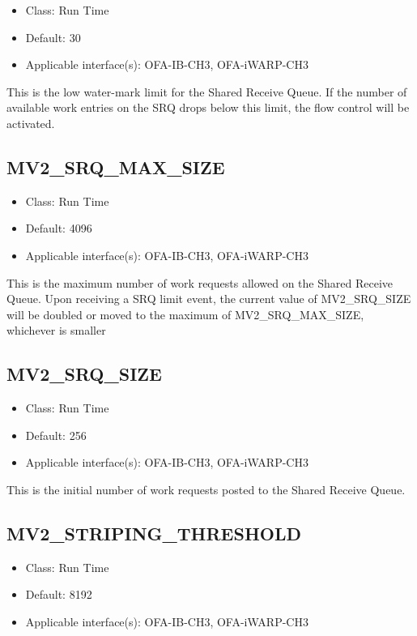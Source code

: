 \begin{itemize}
    \item Class: Run Time
    \item Default: 30
    \item Applicable interface(s): OFA-IB-CH3, OFA-iWARP-CH3
\end{itemize}

This is the low water-mark limit for the
Shared Receive Queue. If the
number of available work entries on the
SRQ drops below this limit, the
flow control will be activated.


\subsection{MV2\_SRQ\_MAX\_SIZE}
\label{def:viadev-srq-max-size}

\begin{itemize}
    \item Class: Run Time
    \item Default: 4096
    \item Applicable interface(s): OFA-IB-CH3, OFA-iWARP-CH3
\end{itemize}

This is the maximum number of work requests allowed on the Shared Receive Queue. 
Upon receiving a SRQ limit event, the current value of MV2\_SRQ\_SIZE will be doubled 
or moved to the maximum of MV2\_SRQ\_MAX\_SIZE, whichever is smaller

\subsection{MV2\_SRQ\_SIZE}
\label{def:viadev-srq-size}

\begin{itemize}
    \item Class: Run Time
    \item Default: 256
    \item Applicable interface(s): OFA-IB-CH3, OFA-iWARP-CH3
\end{itemize}

This is the initial number of work
requests posted to the Shared
Receive Queue. 

\subsection{MV2\_STRIPING\_THRESHOLD}
\label{def:viadev-striping-threshold}

\begin{itemize}
    \item Class: Run Time
    \item Default: 8192
    \item Applicable interface(s): OFA-IB-CH3, OFA-iWARP-CH3
\end{itemize}

